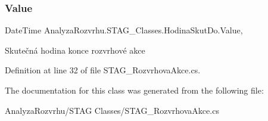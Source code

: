 \subsubsection{\texorpdfstring{Value}{Value}}
{\footnotesize\ttfamily Date\+Time Analyza\+Rozvrhu.\+S\+T\+A\+G\+\_\+\+Classes.\+Hodina\+Skut\+Do.\+Value\hspace{0.3cm}{\ttfamily [get]}, {\ttfamily [set]}}



Skutečná hodina konce rozvrhové akce 



Definition at line 32 of file S\+T\+A\+G\+\_\+\+Rozvrhova\+Akce.\+cs.



The documentation for this class was generated from the following file\+:\begin{DoxyCompactItemize}
\item 
Analyza\+Rozvrhu/\+S\+T\+A\+G Classes/S\+T\+A\+G\+\_\+\+Rozvrhova\+Akce.\+cs\end{DoxyCompactItemize}
